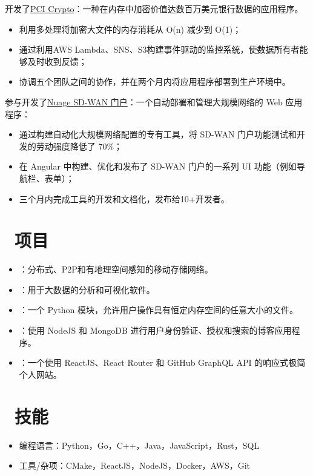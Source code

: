\documentclass{resume}
\begin{document}
开发了\underline{PCI Crypto}：一种在内存中加密价值达数百万美元银行数据的应用程序。
\begin{itemize}
  \item {利用多处理将加密大文件的内存消耗从 O(n) 减少到 O(1)；}
  \item {通过利用AWS Lambda、SNS、S3构建事件驱动的监控系统，使数据所有者能够及时收到反馈；}
  \item {协调五个团队之间的协作，并在两个月内将应用程序部署到生产环境中。}
\end{itemize}

参与开发了\underline{Nuage SD-WAN 门户}：一个自动部署和管理大规模网络的 Web 应用程序：
\begin{itemize}
  \item {通过构建自动化大规模网络配置的专有工具，将 SD-WAN 门户功能测试和开发的劳动强度降低了 70\%；}
  \item {在 Angular 中构建、优化和发布了 SD-WAN 门户的一系列 UI 功能（例如导航栏、表单）；}
  \item {三个月内完成工具的开发和文档化，发布给10+开发者。}
\end{itemize}

\section{\faCodeFork\ 项目}
\begin{itemize}[parsep=0.5ex]
  \item {}：分布式、P2P和有地理空间感知的移动存储网络。
  \item {}：用于大数据的分析和可视化软件。
  \item {}：一个 Python 模块，允许用户操作具有恒定内存空间的任意大小的文件。
  \item {}：使用 NodeJS 和 MongoDB 进行用户身份验证、授权和搜索的博客应用程序。
  \item {}：一个使用 ReactJS、React Router 和 GitHub GraphQL API 的响应式极简个人网站。
\end{itemize}

\section{\faCogs\ 技能}
\begin{itemize}[parsep=0.5ex]
  \item 编程语言：Python，Go，C++，Java，JavaScript，Rust，SQL
  \item 工具/杂项：CMake，ReactJS，NodeJS，Docker，AWS，Git
\end{itemize}

%
%
\end{document}
